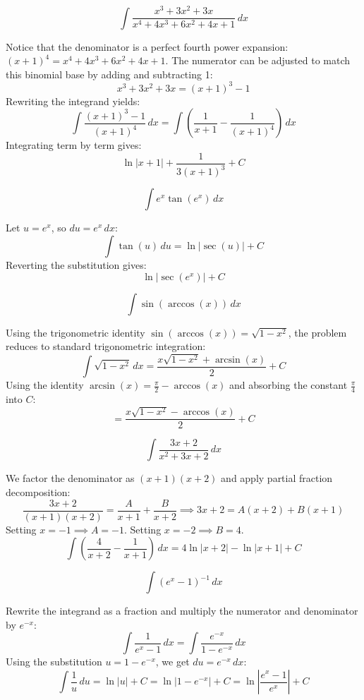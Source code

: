 \begin{questions}
    \question 
    \[ \int \frac{x^{3}+3x^{2}+3x}{x^{4}+4x^{3}+6x^{2}+4x+1} \, dx \]
    \begin{solution}
        Notice that the denominator is a perfect fourth power expansion: $(x+1)^4 = x^4+4x^3+6x^2+4x+1$. The numerator can be adjusted to match this binomial base by adding and subtracting 1:
        \[ x^3+3x^2+3x = (x+1)^3 - 1 \]
        Rewriting the integrand yields:
        \[ \int \frac{(x+1)^3 - 1}{(x+1)^4} \, dx = \int \left( \frac{1}{x+1} - \frac{1}{(x+1)^4} \right) \, dx \]
        Integrating term by term gives:
        \[ \ln|x+1| + \frac{1}{3(x+1)^3} + C \]
    \end{solution}

    \question 
    \[ \int e^{x}\tan(e^{x}) \, dx \]
    \begin{solution}
        Let $u = e^x$, so $du = e^x \, dx$:
        \[ \int \tan(u) \, du = \ln|\sec(u)| + C \]
        Reverting the substitution gives:
        \[ \ln|\sec(e^x)| + C \]
    \end{solution}

    \question 
    \[ \int \sin(\arccos(x)) \, dx \]
    \begin{solution}
        Using the trigonometric identity $\sin(\arccos(x)) = \sqrt{1-x^2}$, the problem reduces to standard trigonometric integration:
        \[ \int \sqrt{1-x^2} \, dx = \frac{x\sqrt{1-x^2} + \arcsin(x)}{2} + C \]
        Using the identity $\arcsin(x) = \frac{\pi}{2} - \arccos(x)$ and absorbing the constant $\frac{\pi}{4}$ into $C$:
        \[ = \frac{x\sqrt{1-x^2} - \arccos(x)}{2} + C \]
    \end{solution}

    \question 
    \[ \int \frac{3x+2}{x^{2}+3x+2} \, dx \]
    \begin{solution}
        We factor the denominator as $(x+1)(x+2)$ and apply partial fraction decomposition:
        \[ \frac{3x+2}{(x+1)(x+2)} = \frac{A}{x+1} + \frac{B}{x+2} \implies 3x+2 = A(x+2) + B(x+1) \]
        Setting $x = -1 \implies A = -1$. Setting $x = -2 \implies B = 4$.
        \[ \int \left( \frac{4}{x+2} - \frac{1}{x+1} \right) \, dx = 4\ln|x+2| - \ln|x+1| + C \]
    \end{solution}

    \question 
    \[ \int (e^{x}-1)^{-1} \, dx \]
    \begin{solution}
        Rewrite the integrand as a fraction and multiply the numerator and denominator by $e^{-x}$:
        \[ \int \frac{1}{e^x-1} \, dx = \int \frac{e^{-x}}{1-e^{-x}} \, dx \]
        Using the substitution $u = 1-e^{-x}$, we get $du = e^{-x} \, dx$:
        \[ \int \frac{1}{u} \, du = \ln|u| + C = \ln|1-e^{-x}| + C = \ln\left|\frac{e^x-1}{e^x}\right| + C \]
    \end{solution}


\end{questions}
